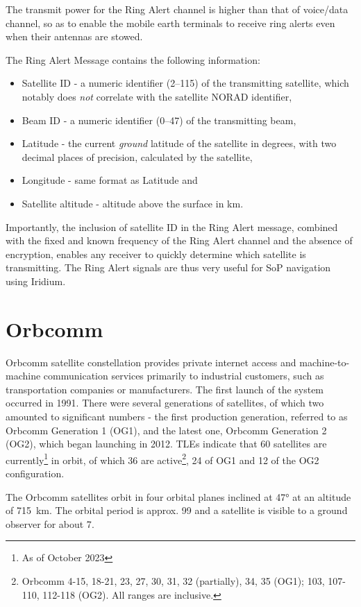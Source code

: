 The transmit power for the Ring Alert channel is higher than that of voice/data channel, so as to enable the mobile earth terminals to receive ring alerts even when their antennas are stowed\cite{sat09}.

The Ring Alert Message contains the following information\cite{sat08}:
\begin{itemize}
    \item Satellite ID - a numeric identifier (\numrange{2}{115}) of the transmitting satellite, which notably does \emph{not} correlate with the satellite NORAD identifier,
    \item Beam ID - a numeric identifier (\numrange{0}{47}) of the transmitting beam,
    \item Latitude - the current \emph{ground} latitude of the satellite in degrees, with two decimal places of precision, calculated by the satellite,
    \item Longitude - same format as Latitude and
    \item Satellite altitude - altitude above the surface in \unit{\km}.
\end{itemize}

Importantly, the inclusion of satellite ID in the Ring Alert message, combined with the fixed and known frequency of the Ring Alert channel and the absence of encryption, enables any receiver to quickly determine which satellite is transmitting. The Ring Alert signals are thus very useful for SoP navigation using Iridium.


\section{Orbcomm}
Orbcomm satellite constellation provides private internet access and machine-to-machine communication services primarily to industrial customers, such as transportation companies or manufacturers. The first launch of the system occurred in 1991. There were several generations of satellites, of which two amounted to significant numbers - the first production generation, referred to as Orbcomm Generation 1 (OG1), and the latest one, Orbcomm Generation 2 (OG2), which began launching in 2012. TLEs indicate that 60 satellites are currently\footnote{As of October 2023} in orbit, of which 36 are active\footnote{Orbcomm 4-15, 18-21, 23, 27, 30, 31, 32 (partially), 34, 35 (OG1); 103, 107-110, 112-118 (OG2). All ranges are inclusive.}, 24 of OG1 and 12 of the OG2 configuration\cite{sat12}.

The Orbcomm satellites orbit in four orbital planes inclined at \ang{47} at an altitude of \qty{715}{km}. The orbital period is approx. \qty{99}{\min} and a satellite is visible to a ground observer for about \qty{7}{\min}\cite{sat11, sop08}. %

